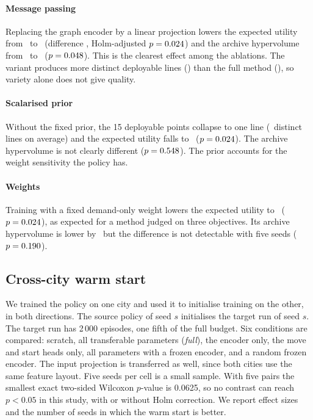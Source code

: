 

\paragraph{Message passing} Replacing the graph encoder by a linear projection lowers the expected utility from \AblFullEum\ to \AblNoMessagePassingEum\ (difference \AblNoMessagePassingEumDiff, Holm-adjusted $p=0.024$) and the archive hypervolume from \AblFullHv\ to \AblNoMessagePassingHv\ ($p=0.048$). This is the clearest effect among the ablations. The variant produces more distinct deployable lines (\AblNoMessagePassingLines) than the full method (\AblFullLines), so variety alone does not give quality.

\paragraph{Scalarised prior} Without the fixed prior, the 15 deployable points collapse to one line (\AblNoPriorLines\ distinct lines on average) and the expected utility falls to \AblNoPriorEum\ ($p=0.024$). The archive hypervolume is not clearly different ($p=0.548$). The prior accounts for the weight sensitivity the policy has.

\paragraph{Weights} Training with a fixed demand-only weight lowers the expected utility to \AblDemandOnlyEum\ ($p=0.024$), as expected for a method judged on three objectives. Its archive hypervolume is lower by \AblDemandOnlyHvDiff\ but the difference is not detectable with five seeds ($p=0.190$).

\subsection{Cross-city warm start}\label{sec:res-transfer}
We trained the policy on one city and used it to initialise training on the other, in both directions. The source policy of seed $s$ initialises the target run of seed $s$. The target run has 2\,000 episodes, one fifth of the full budget. Six conditions are compared: scratch, all transferable parameters (\emph{full}), the encoder only, the move and start heads only, all parameters with a frozen encoder, and a random frozen encoder. The input projection is transferred as well, since both cities use the same feature layout. Five seeds per cell is a small sample. With five pairs the smallest exact two-sided Wilcoxon $p$-value is 0.0625, so no contrast can reach $p<0.05$ in this study, with or without Holm correction. We report effect sizes and the number of seeds in which the warm start is better.

